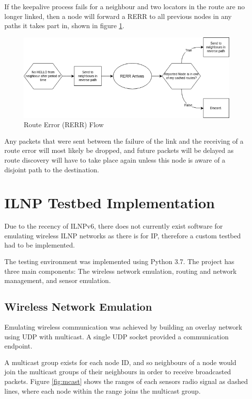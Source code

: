 \documentclass[12pt]{article}
\begin{document}
If the keepalive process fails for a neighbour and two locators in the route are no longer linked, then a node will forward a RERR to all previous nodes in any paths it takes part in, shown in figure \ref{fig:rerrflow}.

\begin{figure}[h]
	\centering
	\includegraphics[width=\linewidth]{images/rerrflow}
	\caption{Route Error (RERR) Flow}
	\label{fig:rerrflow}
\end{figure}

Any packets that were sent between the failure of the link and the receiving of a route error will most likely be dropped, and future packets will be delayed as route discovery will have to take place again unless this node is aware of a disjoint path to the destination.

\FloatBarrier
\pagebreak
\section{ILNP Testbed Implementation}

Due to the recency of ILNPv6, there does not currently exist software for emulating wireless ILNP networks as there is for IP, therefore a custom testbed had to be implemented.  

The testing environment was implemented using Python 3.7. The project has three main components: The wireless network emulation, routing and network management, and sensor emulation. 

\subsection{Wireless Network Emulation}

Emulating wireless communication was achieved by building an overlay network using UDP with multicast. A single UDP socket provided a communication endpoint.

A multicast group exists for each node ID, and so neighbours of a node would join the multicast groups of their neighbours in order to receive broadcasted packets. Figure \ref{fig:mcast} shows the ranges of each sensors radio signal as dashed lines, where each node within the range joins the multicast group.
\end{document}

